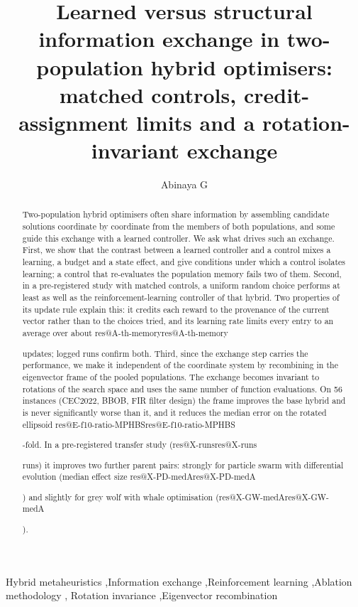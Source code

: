 \documentclass[preprint,12pt,authoryear]{elsarticle}
\makeatletter
\theoremstyle{definition}
\theoremstyle{remark}
\def\res#1{\ifcsname res@#1\endcsname\csname res@#1\endcsname\else\PackageError{res}{Undefined result key #1}{}\fi}
\makeatother
\begin{document}
\begin{frontmatter}

\title{Learned versus structural information exchange in two-population hybrid optimisers: matched controls,
credit-assignment limits and a rotation-invariant exchange}

\author[1]{Abinaya G}

\begin{abstract}
Two-population hybrid optimisers often share information by assembling candidate solutions coordinate by coordinate from
the members of both populations, and some guide this exchange with a learned controller. We ask what drives such an
exchange. First, we show that the contrast between a learned controller and a control mixes a learning, a budget and a
state effect, and give conditions under which a control isolates learning; a control that re-evaluates the population memory
fails two of them. Second, in a pre-registered study with matched controls, a uniform random choice performs at least as well as
the reinforcement-learning controller of that hybrid. Two properties of its update rule explain this: it credits each
reward to the provenance of the current vector rather than to the choices tried, and its learning rate limits every entry
to an average over about \res{A-th-memory} updates; logged runs confirm both. Third, since the exchange step carries the
performance, we make it independent of the coordinate system by recombining in the eigenvector frame of the pooled
populations. The exchange becomes invariant to rotations of the search space and uses the same number of function
evaluations. On 56 instances (CEC2022, BBOB, FIR filter design) the frame improves the base hybrid and is never
significantly worse than it, and it reduces the median error on the rotated ellipsoid \res{E-f10-ratio-MPHBS}-fold. In a pre-registered
transfer study (\res{X-runs} runs) it improves two further parent pairs: strongly for particle swarm with differential
evolution (median effect size \res{X-PD-medA}) and slightly for grey wolf with whale optimisation (\res{X-GW-medA}).
\end{abstract}

\begin{keyword}
Hybrid metaheuristics \sep Information exchange \sep Reinforcement learning \sep Ablation methodology \sep
Rotation invariance \sep Eigenvector recombination
\end{keyword}

\end{frontmatter}





\FloatBarrier


\end{document}
